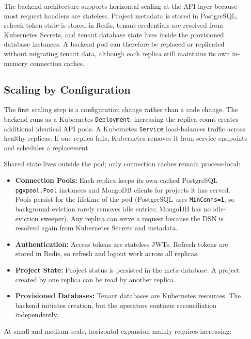 The backend architecture supports horizontal scaling at the API layer because most request handlers are stateless. Project metadata is stored in PostgreSQL, refresh-token state is stored in Redis, tenant credentials are resolved from Kubernetes Secrets, and tenant database state lives inside the provisioned database instances. A backend pod can therefore be replaced or replicated without migrating tenant data, although each replica still maintains its own in-memory connection caches.

\subsection{Scaling by Configuration}

The first scaling step is a configuration change rather than a code change. The backend runs as a Kubernetes \texttt{Deployment}; increasing the replica count creates additional identical API pods. A Kubernetes \texttt{Service} load-balances traffic across healthy replicas. If one replica fails, Kubernetes removes it from service endpoints and schedules a replacement.

Shared state lives outside the pod; only connection caches remain process-local:

\begin{itemize}
    \item \textbf{Connection Pools:} Each replica keeps its own cached PostgreSQL \texttt{pgxpool.Pool} instances and MongoDB clients for projects it has served. Pools persist for the lifetime of the pod (PostgreSQL uses \texttt{MinConns=1}, so background eviction rarely removes idle entries; MongoDB has no idle-eviction sweeper). Any replica can serve a request because the DSN is resolved again from Kubernetes Secrets and metadata.
    \item \textbf{Authentication:} Access tokens are stateless JWTs. Refresh tokens are stored in Redis, so refresh and logout work across all replicas.
    \item \textbf{Project State:} Project status is persisted in the meta-database. A project created by one replica can be read by another replica.
    \item \textbf{Provisioned Databases:} Tenant databases are Kubernetes resources. The backend initiates creation, but the operators continue reconciliation independently.
\end{itemize}

At small and medium scale, horizontal expansion mainly requires increasing:

